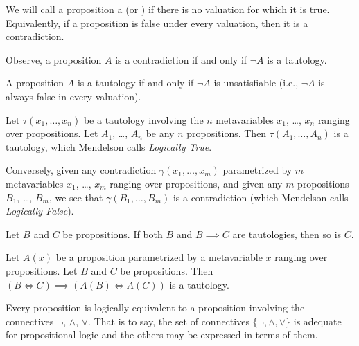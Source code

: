 \begin{node}[Semantics]
\begin{definition}\label{prop-0008}%
We will call a proposition a  (or
) if there is no valuation for which it is
true. Equivalently, if a proposition is false under every valuation,
then it is a contradiction. 
\begin{node}\label{prop-0009}%
Observe, a proposition $A$ is a contradiction if and only if $\neg A$
is a tautology.
\end{node}

\begin{node}\label{prop:semantics-0003}%
A proposition $A$ is a tautology if and only if $\neg A$ is
unsatisfiable (i.e., $\neg A$ is always false in every valuation).
\end{node}
\end{definition}

\begin{node}\label{prop-000A}%
Let $\tau(x_{1},\dots,x_{n})$ be a tautology involving the $n$
metavariables $x_{1}$, \dots, $x_{n}$ ranging over propositions. Let
$A_{1}$, \dots, $A_{n}$ be any $n$ propositions. Then $\tau(A_{1},\dots,
A_{n})$ is a tautology, which Mendelson calls \textit{Logically True}.

Conversely, given any contradiction $\gamma(x_{1},\dots, x_{m})$
parametrized by $m$ metavariables $x_{1}$, \dots, $x_{m}$ ranging over
propositions, and given any $m$ propositions $B_{1}$, \dots, $B_{m}$, we
see that $\gamma(B_{1},\dots,B_{m})$ is a contradiction (which Mendelson
calls \textit{Logically False}).
\end{node}

\begin{node}\label{prop-000B}%
Let $B$ and $C$ be propositions.
If both $B$ and $B\implies C$ are tautologies, then so is $C$.
\end{node}

\begin{node}\label{prop-000C}%
Let $A(x)$ be a proposition parametrized by a metavariable $x$ ranging
over propositions.
Let $B$ and $C$ be propositions. Then $(B\iff C)\implies(A(B)\iff A(C))$
is a tautology.
\end{node}

\begin{node}\label{prop-000E}%
Every proposition is logically equivalent to a proposition involving the
connectives $\neg$, $\land$, $\lor$. That is to say, the set of
connectives $\{\neg,\land,\lor\}$ is adequate for propositional logic
and the others may be expressed in terms of them.


\end{node}
\end{node}
